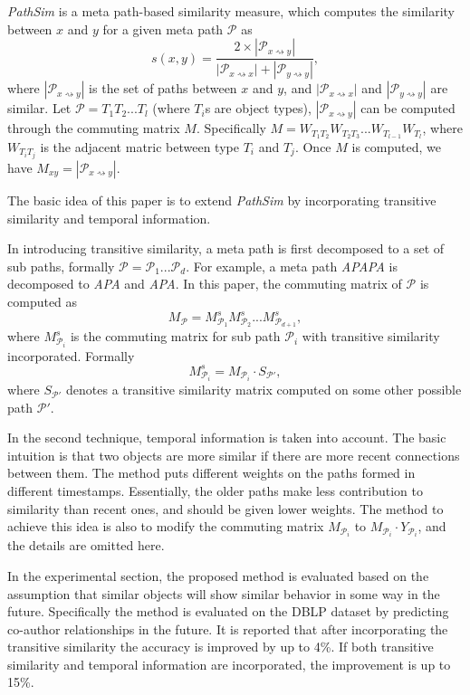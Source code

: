 \documentclass[paper=a4, fontsize=18pt]{article} %
\numberwithin{equation}{section} %
\numberwithin{figure}{section} %
\numberwithin{table}{section} %
\begin{document}
\emph{PathSim} \cite{SHYYW11} is a meta path-based similarity measure, which computes the similarity between $x$ and $y$ for a given meta path $\mathcal{P}$ as
$$s(x,y) = \frac{2 \times | \mathcal{P}_{x \rightsquigarrow y} |}{| \mathcal{P}_{x \rightsquigarrow x} | + | \mathcal{P}_{y \rightsquigarrow y} |},$$
where $| \mathcal{P}_{x \rightsquigarrow y} |$ is the set of paths between $x$ and $y$, and $| \mathcal{P}_{x \rightsquigarrow x} |$ and $| \mathcal{P}_{y \rightsquigarrow y} |$ are similar. Let $\mathcal{P} = T_1T_2...T_l$ (where $T_i$s are object types), $| \mathcal{P}_{x \rightsquigarrow y} |$ can be computed through the commuting matrix $M$. Specifically $M = W_{T_1T_2}W_{T_2T_3}...W_{T_{l-1}}W_{T_l}$, where $W_{T_iT_j}$ is the adjacent matric between type $T_i$ and $T_j$. Once $M$ is computed, we have $M_{xy} = | \mathcal{P}_{x \rightsquigarrow y} |$.

The basic idea of this paper is to extend \emph{PathSim} by incorporating transitive similarity and temporal information.

In introducing transitive similarity, a meta path is first decomposed to a set of sub paths, formally $\mathcal{P} = \mathcal{P}_1 ... \mathcal{P}_d$. For example, a meta path \emph{APAPA} is decomposed to \emph{APA} and \emph{APA}. In this paper, the commuting matrix of $\mathcal{P}$ is computed as
$$M_{\mathcal{P}} = M_{\mathcal{P}_1}^s M_{\mathcal{P}_2}^s... M_{\mathcal{P}_{d+1}}^s,$$
where $M_{\mathcal{P}_i}^s$ is the commuting matrix for sub path $\mathcal{P}_i$ with transitive similarity incorporated. Formally
$$M_{\mathcal{P}_i}^s = M_{\mathcal{P}_i} \cdot S_{\mathcal{P}'},$$
where $S_{\mathcal{P}'}$ denotes a transitive similarity matrix computed on some other possible path $\mathcal{P}'$.

In the second technique, temporal information is taken into account. The basic intuition is that two objects are more similar if there are more recent connections between them. The method puts different weights on the paths formed in different timestamps. Essentially, the older paths make less contribution to similarity than recent ones, and should be given lower weights. The method to achieve this idea is also to modify the commuting matrix $M_{\mathcal{P}_i}$ to $M_{\mathcal{P}_i} \cdot Y_{\mathcal{P}_i}$, and the details are omitted here.

In the experimental section, the proposed method is evaluated based on the assumption that similar objects will show similar behavior in some way in the future. Specifically the method is evaluated on the DBLP dataset by predicting co-author relationships in the future. It is reported that after incorporating the transitive similarity the accuracy is improved by up to 4\%. If both transitive similarity and temporal information are incorporated, the improvement is up to 15\%.
\end{document}
